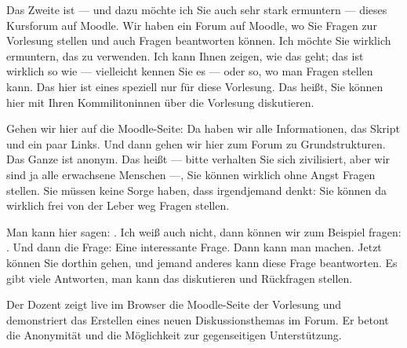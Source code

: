 \begin{spoken-clean}[00:14:15 - 00:16:30]
Das Zweite ist --- und dazu möchte ich Sie auch sehr stark ermuntern --- dieses Kursforum auf Moodle. Wir haben ein Forum auf Moodle, wo Sie Fragen zur Vorlesung stellen und auch Fragen beantworten können. Ich möchte Sie wirklich ermuntern, das zu verwenden. Ich kann Ihnen zeigen, wie das geht; das ist wirklich so wie --- vielleicht kennen Sie es ---  oder so, wo man Fragen stellen kann. Das hier ist eines speziell nur für diese Vorlesung. Das heißt, Sie können hier mit Ihren Kommilitoninnen über die Vorlesung diskutieren. 

Gehen wir hier auf die Moodle-Seite: Da haben wir alle Informationen, das Skript und ein paar Links. Und dann gehen wir hier zum Forum zu Grundstrukturen. Das Ganze ist anonym. Das heißt --- bitte verhalten Sie sich zivilisiert, aber wir sind ja alle erwachsene Menschen ---, Sie können wirklich ohne Angst Fragen stellen. Sie müssen keine Sorge haben, dass irgendjemand denkt:  Sie können da wirklich frei von der Leber weg Fragen stellen. 

Man kann hier sagen: . Ich weiß auch nicht, dann können wir zum Beispiel fragen: . Und dann die Frage:  Eine interessante Frage. Dann kann man  machen. Jetzt können Sie dorthin gehen, und jemand anderes kann diese Frage beantworten. Es gibt viele Antworten, man kann das diskutieren und Rückfragen stellen.
\end{spoken-clean}

\begin{meta-note}
Der Dozent zeigt live im Browser die Moodle-Seite der Vorlesung und demonstriert das Erstellen eines neuen Diskussionsthemas im Forum. Er betont die Anonymität und die Möglichkeit zur gegenseitigen Unterstützung.
\end{meta-note}

